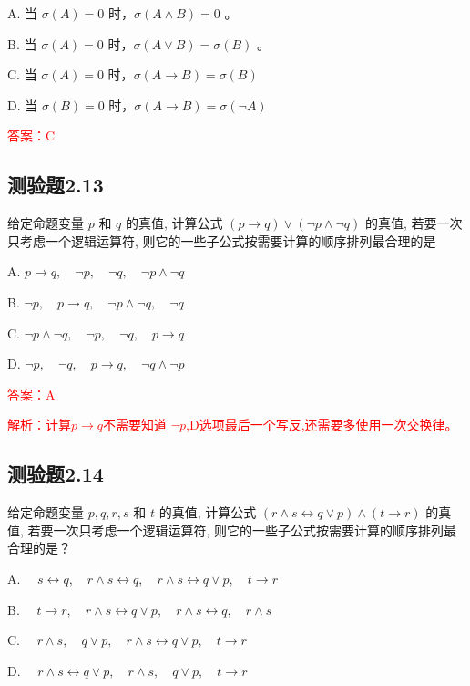 \documentclass[UTF8, heading=true]{ctexart}
\begin{document}
A. 当 $\sigma(A)=0$ 时，$\sigma(A \wedge B)=0$ 。

B. 当 $\sigma(A)=0$ 时，$\sigma(A \vee B)=\sigma(B)$ 。

C. 当 $\sigma(A)=0$ 时，$\sigma(A \rightarrow B)=\sigma(B)$

D. 当 $\sigma(B)=0$ 时，$\sigma(A \rightarrow B)=\sigma(\neg A)$

\textcolor{red}{答案：C}

\subsection{测验题2.13}

给定命题变量 $p$ 和 $q$ 的真值, 计算公式 $(p \rightarrow q) \vee(\neg p \wedge \neg q)$ 的真值, 若要一次只考虑一个逻辑运算符, 则它的一些子公式按需要计算的顺序排列最合理的是 $\qquad$

A. $
p \rightarrow q, \quad \neg p, \quad \neg q, \quad \neg p \wedge \neg q
$

B. $
\neg p, \quad p \rightarrow q, \quad \neg p \wedge \neg q, \quad \neg q
$

C. $
\neg p \wedge \neg q, \quad \neg p, \quad \neg q, \quad p \rightarrow q
$

D. $
\neg p, \quad \neg q, \quad p \rightarrow q, \quad \neg q \wedge \neg p
$

\textcolor{red}{答案：A}

\textcolor{red}{解析：计算$p \rightarrow q$不需要知道 $\neg p$,D选项最后一个写反,还需要多使用一次交换律。}


\subsection{测验题2.14}

给定命题变量 $p, q, r, s$ 和 $t$ 的真值, 计算公式 $(r \wedge s \leftrightarrow q \vee p) \wedge(t \rightarrow r)$ 的真值, 若要一次只考虑一个逻辑运算符, 则它的一些子公式按需要计算的顺序排列最合理的是？

A. $\quad s \leftrightarrow q, \quad r \wedge s \leftrightarrow q, \quad r \wedge s \leftrightarrow q \vee p, \quad t \rightarrow r$

B. $\quad t \rightarrow r, \quad r \wedge s \leftrightarrow q \vee p, \quad r \wedge s \leftrightarrow q, \quad r \wedge s$

C. $\quad r \wedge s, \quad q \vee p, \quad r \wedge s \leftrightarrow q \vee p, \quad t \rightarrow r$

D. $\quad r \wedge s \leftrightarrow q \vee p, \quad r \wedge s, \quad q \vee p, \quad t \rightarrow r$
\end{document}
